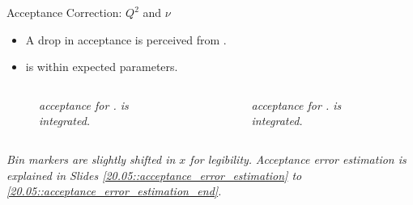 \begin{frame}{Acceptance Correction: $Q^2$ and $\nu$}
    \label{11.52::electron_variables}

    \begin{itemize}
        \item
            A drop in  acceptance is perceived from .

        \item
            \ef{$\nu$} is within expected parameters.
    \end{itemize}

    \vspace{-12pt}
    \begin{columns}[onlytextwidth,T]

    \begin{column}{.49\linewidth}
        \begin{center}
            \begin{figure}[t]
                \scriptsize{\textit{
                     acceptance for .
                    \ef{$\nu$} is integrated.
                }}
            \end{figure}
        \end{center}
    \end{column}

    \begin{column}{.49\linewidth}
        \begin{center}
            \begin{figure}[t]
                \scriptsize{\textit{
                    \ef{$\nu$} acceptance for .
                     is integrated.
                }}
            \end{figure}
        \end{center}
    \end{column}

    \end{columns}

    \begin{flushright}
        \tiny{\textit{Bin markers are slightly shifted in $x$ for legibility.}}
        \tiny{\textit{Acceptance error estimation is explained in Slides \textcolor{efd_purple}{\ref{20.05::acceptance_error_estimation}} to \textcolor{efd_purple}{\ref{20.05::acceptance_error_estimation_end}}.}}
    \end{flushright}
\end{frame}

